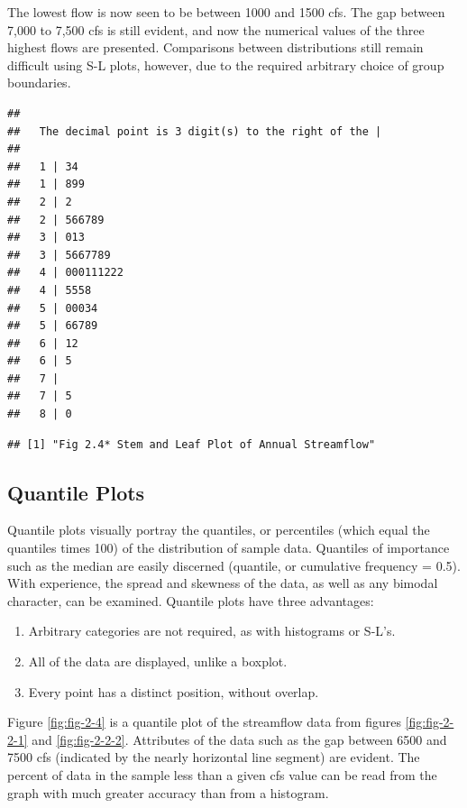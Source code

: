 \documentclass[]{book}
\providecommand{\tightlist}{%
  \setlength{\itemsep}{0pt}\setlength{\parskip}{0pt}}
\begin{document}
The lowest flow is now seen to be between 1000 and 1500 cfs. The gap between 7,000 to 7,500 cfs is still evident, and now the numerical values of the three highest flows are presented. Comparisons between distributions still remain difficult using S-L plots, however, due to the required arbitrary choice of group boundaries.

\begin{verbatim}
## 
##   The decimal point is 3 digit(s) to the right of the |
## 
##   1 | 34
##   1 | 899
##   2 | 2
##   2 | 566789
##   3 | 013
##   3 | 5667789
##   4 | 000111222
##   4 | 5558
##   5 | 00034
##   5 | 66789
##   6 | 12
##   6 | 5
##   7 | 
##   7 | 5
##   8 | 0
\end{verbatim}

\begin{verbatim}
## [1] "Fig 2.4* Stem and Leaf Plot of Annual Streamflow"
\end{verbatim}

\hypertarget{quantile-plots}{%
\subsection{Quantile Plots}\label{quantile-plots}}

Quantile plots visually portray the quantiles, or percentiles (which equal the quantiles times 100) of the distribution of sample data. Quantiles of importance such as the median are easily discerned (quantile, or cumulative frequency = 0.5). With experience, the spread and skewness of the data, as well as any bimodal character, can be examined. Quantile plots have three advantages:

\begin{enumerate}
\def\labelenumi{\arabic{enumi}.}
\tightlist
\item
  Arbitrary categories are not required, as with histograms or S-L's.
\item
  All of the data are displayed, unlike a boxplot.
\item
  Every point has a distinct position, without overlap.
\end{enumerate}

Figure \ref{fig:fig-2-4} is a quantile plot of the streamflow data from figures \ref{fig:fig-2-2-1} and \ref{fig:fig-2-2-2}. Attributes of the data such as the gap between 6500 and 7500 cfs (indicated by the nearly horizontal line segment) are evident. The percent of data in the sample less than a given cfs value can be read from the graph with much greater accuracy than from a histogram.
\end{document}
